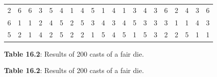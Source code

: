 \begin{description}[noitemsep]
\begin{description}[noitemsep]
\begin{table}
\begin{center}
\begin{xtabular}[t]{|l|l|l|l|l|l|l|l|l|l|l|l|l|l|l|l|l|l|l|l|}
        2 &
        6 &
        6 &
        3 &
        5 &
        4 &
        1 &
        4 &
        5 &
        1 &
        4 &
        1 &
        3 &
        4 &
        3 &
        6 &
        2 &
        4 &
        3 &
        6%
     \tabularnewline{}
        6 &
        1 &
        1 &
        2 &
        4 &
        5 &
        2 &
        5 &
        3 &
        4 &
        3 &
        4 &
        5 &
        3 &
        3 &
        3 &
        1 &
        1 &
        4 &
        3%
     \tabularnewline{}
        5 &
        2 &
        1 &
        4 &
        2 &
        5 &
        2 &
        2 &
        1 &
        5 &
        4 &
        5 &
        1 &
        5 &
        3 &
        2 &
        2 &
        5 &
        1 &
        1%
     \tabularnewline{}
    \end{xtabular}
      \end{center}
    \begin{center}{\small\bfseries Table 16.2}: Results of 200 casts of a fair die.\end{center}
    \begin{caption}{\small\bfseries Table 16.2}: Results of 200 casts of a fair die.\end{caption}
\end{table}
    \par
      \label{m39403*uid28}

\end{description}
\end{description}
